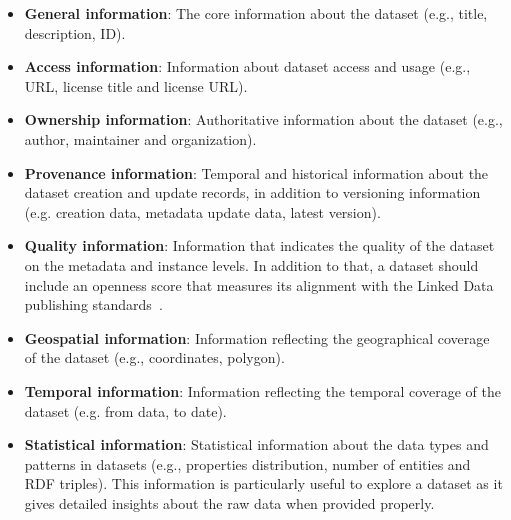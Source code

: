 \documentclass[runningheads,a4paper]{llncs}
\begin{document}
\begin{itemize}
\item \textbf{General information}: The core information about the dataset (e.g., title, description, ID).
\item \textbf{Access information}: Information about dataset access and usage (e.g., URL, license title and license URL).
\item \textbf{Ownership information}: Authoritative information about the dataset (e.g., author, maintainer and organization).
\item \textbf{Provenance information}: Temporal and historical information about the dataset creation and update records, in addition to versioning information (e.g. creation data, metadata update data, latest version).
\item \textbf{Quality information}: Information that indicates the quality of the dataset on the metadata and instance levels. In addition to that, a dataset should include an openness score that measures its alignment with the Linked Data publishing standards~\cite{tim:linkedata}.
\item \textbf{Geospatial information}: Information reflecting the geographical coverage of the dataset (e.g., coordinates, polygon).
\item \textbf{Temporal information}: Information reflecting the temporal coverage of the dataset (e.g. from data, to date).
\item \textbf{Statistical information}: Statistical information about the data types and patterns in datasets (e.g., properties distribution, number of entities and RDF triples). This information is particularly useful to explore a dataset as it gives detailed insights about the raw data when provided properly.
\end{itemize}
\end{document}
